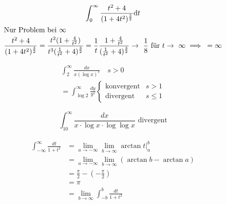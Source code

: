 \begin{bsp*}
	\begin{gather*}
		\int_0^\infty \frac{t^2+4}{(1+4t^2)^{\frac{3}{2}}} \dd t \\
		\intertext{Nur Problem bei $\infty$}
		\frac{t^2+4}{(1+4t^2)^{\frac{3}{2}}} = \frac{t^2(1+\frac{4}{t^2})}{t^3(\frac{1}{t^2}+4)^{\frac{3}{2}}} = \frac{1}{t} \frac{1+\frac{4}{t^2}}{(\frac{1}{t^2}+4)^{\frac{3}{2}}} \rightarrow \frac{1}{8} \text{ für } t \rightarrow \infty \implies = \infty
	\end{gather*}
\end{bsp*}
\begin{bsp*}
	\begin{gather*}
		\int_2^\infty \frac{dx}{x(\log x)^s} \quad s > 0 \\
		= \int_{\log 2}^\infty \frac{dy}{y^s} \begin{cases}
			\text{konvergent}	&s > 1	\\
			\text{divergent}		&s \leq 1	
		\end{cases}
	\end{gather*}
\end{bsp*}
\begin{bsp*}
	\[ \int_{10}^\infty \frac{dx}{x \cdot \log x \cdot \log \log x} \text{ divergent} \]
\end{bsp*}
\begin{bsp*}
	\begin{gather*}
		\begin{split}
			\int_{-\infty}^\infty \frac{dt}{1+t^2}	&= \lim_{a \rightarrow -\infty} \lim_{b \rightarrow \infty} \arctan t |_a^b \\
										&= \lim_{a \rightarrow -\infty} \lim_{b \rightarrow \infty} (\arctan b - \arctan a) \\
										&= \frac{\pi}{2} - \left( -\frac{\pi}{2} \right) \\
										&= \pi \\
										&= \lim_{b \rightarrow \infty} \int_{-b}^b \frac{dt}{1+t^2}
		\end{split}
	\end{gather*}
\end{bsp*}
